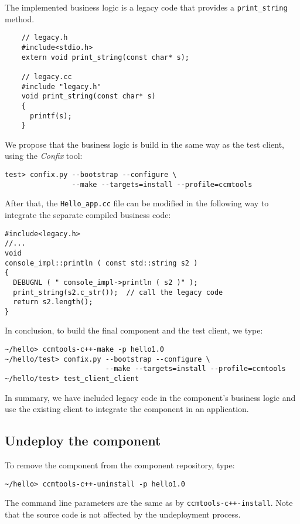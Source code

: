 \noindent
The implemented business logic is a legacy code that provides a 
{\tt print\_string} method.
\begin{verbatim}
    // legacy.h	
    #include<stdio.h>
    extern void print_string(const char* s);

    // legacy.cc
    #include "legacy.h"
    void print_string(const char* s)
    {
      printf(s);
    }
\end{verbatim}

\noindent
We propose that the business logic is build in the same way as the test client,
using the {\it Confix} tool:
\begin{verbatim}
test> confix.py --bootstrap --configure \
                --make --targets=install --profile=ccmtools
\end{verbatim}

\noindent
After that, the {\tt Hello\_app.cc} file can be modified in the following way
to integrate the separate compiled business code:
\begin{verbatim}
#include<legacy.h>
//...
void
console_impl::println ( const std::string s2 )
{
  DEBUGNL ( " console_impl->println ( s2 )" );
  print_string(s2.c_str());  // call the legacy code
  return s2.length();
}
\end{verbatim}

\noindent
In conclusion, to build the final component and the test client, we type:
\begin{verbatim}
~/hello> ccmtools-c++-make -p hello1.0
~/hello/test> confix.py --bootstrap --configure \
                        --make --targets=install --profile=ccmtools
~/hello/test> test_client_client
\end{verbatim}

\noindent
In summary, we have included legacy code in the component's business logic and 
use the existing client to integrate the component in an application.


\subsection{Undeploy the component}

To remove the component from the component repository, type:
\begin{verbatim}
~/hello> ccmtools-c++-uninstall -p hello1.0
\end{verbatim}
The command line parameters are the same as by {\tt ccmtools-c++-install}.
Note that the source code is not affected by the undeployment process.




